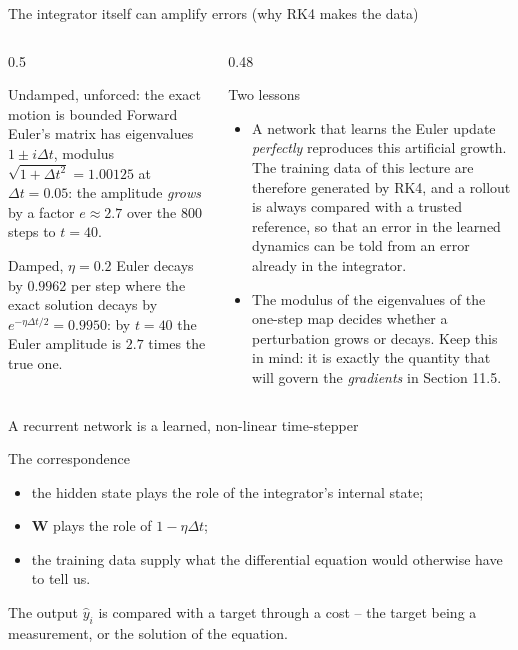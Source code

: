 \documentclass[10pt,aspectratio=169]{beamer}
\begin{document}
\begin{frame}{The integrator itself can amplify errors (why RK4 makes the data)}
\begin{columns}[T]
\begin{column}{0.5\textwidth}
\begin{block}{Undamped, unforced: the exact motion is bounded}
Forward Euler's matrix has eigenvalues $1\pm i\Delta t$, modulus
$\sqrt{1+\Delta t^2}=1.00125$ at $\Delta t=0.05$: the amplitude \emph{grows}
by a factor $e\approx2.7$ over the $800$ steps to $t=40$.
\end{block}
\begin{block}{Damped, $\eta=0.2$}
Euler decays by $0.9962$ per step where the exact solution decays by
$e^{-\eta\Delta t/2}=0.9950$: by $t=40$ the Euler amplitude is $2.7$ times
the true one.
\end{block}
\end{column}
\begin{column}{0.48\textwidth}
\begin{block}{Two lessons}
\begin{itemize}
  \item A network that learns the Euler update \emph{perfectly} reproduces
        this artificial growth.  The training data of this lecture are
        therefore generated by RK4, and a rollout is always compared with a
        trusted reference, so that an error in the learned dynamics can be
        told from an error already in the integrator.
  \item The modulus of the eigenvalues of the one-step map decides whether
        a perturbation grows or decays.  Keep this in mind: it is exactly the
        quantity that will govern the \emph{gradients} in Section 11.5.
\end{itemize}
\end{block}
\end{column}
\end{columns}
\end{frame}


\begin{frame}{A recurrent network is a learned, non-linear time-stepper}
\begin{block}{The correspondence}
\begin{itemize}
  \item the hidden state plays the role of the integrator's internal state;
  \item $\bm{W}$ plays the role of $1-\eta\Delta t$;
  \item the training data supply what the differential equation would
        otherwise have to tell us.
\end{itemize}
\end{block}
\medskip
The output $\hat{y}_i$ is compared with a target through a cost -- the
target being a measurement, or the solution of the equation.
\end{frame}
\end{document}
